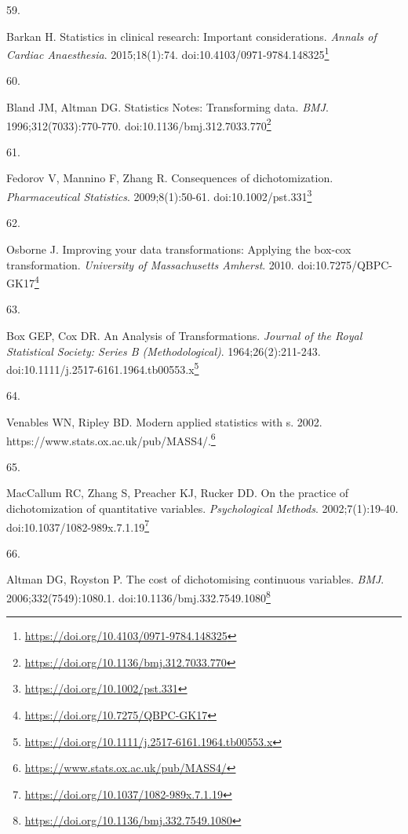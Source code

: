 \documentclass[
  a4paper,
]{book}
\newlength{\cslhangindent}
\newlength{\csllabelwidth}
\newlength{\cslentryspacingunit} %
\newenvironment{CSLReferences}[2] %
 {%
  \setlength{\parindent}{0pt}
  \ifodd #1
  \let\oldpar\par
  \def\par{\hangindent=\cslhangindent\oldpar}
  \fi
  \setlength{\parskip}{#2\cslentryspacingunit}
 }%
 {}
\newcommand{\CSLLeftMargin}[1]{\parbox[t]{\csllabelwidth}{#1}}
\newcommand{\CSLRightInline}[1]{\parbox[t]{\linewidth - \csllabelwidth}{#1}\break}
\renewcommand{\href}[2]{#2\footnote{\url{#1}}}
\begin{document}
\begin{CSLReferences}{0}{0}
\leavevmode{}%
\CSLLeftMargin{59. }%
\CSLRightInline{Barkan H. Statistics in clinical research: Important considerations. \emph{Annals of Cardiac Anaesthesia}. 2015;18(1):74. doi:\href{https://doi.org/10.4103/0971-9784.148325}{10.4103/0971-9784.148325}}

\leavevmode{}%
\CSLLeftMargin{60. }%
\CSLRightInline{Bland JM, Altman DG. Statistics Notes: Transforming data. \emph{BMJ}. 1996;312(7033):770-770. doi:\href{https://doi.org/10.1136/bmj.312.7033.770}{10.1136/bmj.312.7033.770}}

\leavevmode{}%
\CSLLeftMargin{61. }%
\CSLRightInline{Fedorov V, Mannino F, Zhang R. Consequences of dichotomization. \emph{Pharmaceutical Statistics}. 2009;8(1):50-61. doi:\href{https://doi.org/10.1002/pst.331}{10.1002/pst.331}}

\leavevmode{}%
\CSLLeftMargin{62. }%
\CSLRightInline{Osborne J. Improving your data transformations: Applying the box-cox transformation. \emph{University of Massachusetts Amherst}. 2010. doi:\href{https://doi.org/10.7275/QBPC-GK17}{10.7275/QBPC-GK17}}

\leavevmode{}%
\CSLLeftMargin{63. }%
\CSLRightInline{Box GEP, Cox DR. An Analysis of Transformations. \emph{Journal of the Royal Statistical Society: Series B (Methodological)}. 1964;26(2):211-243. doi:\href{https://doi.org/10.1111/j.2517-6161.1964.tb00553.x}{10.1111/j.2517-6161.1964.tb00553.x}}

\leavevmode{}%
\CSLLeftMargin{64. }%
\CSLRightInline{Venables WN, Ripley BD. Modern applied statistics with s. 2002. \href{https://www.stats.ox.ac.uk/pub/MASS4/}{https://www.stats.ox.ac.uk/pub/MASS4/.}}

\leavevmode{}%
\CSLLeftMargin{65. }%
\CSLRightInline{MacCallum RC, Zhang S, Preacher KJ, Rucker DD. On the practice of dichotomization of quantitative variables. \emph{Psychological Methods}. 2002;7(1):19-40. doi:\href{https://doi.org/10.1037/1082-989x.7.1.19}{10.1037/1082-989x.7.1.19}}

\leavevmode{}%
\CSLLeftMargin{66. }%
\CSLRightInline{Altman DG, Royston P. The cost of dichotomising continuous variables. \emph{BMJ}. 2006;332(7549):1080.1. doi:\href{https://doi.org/10.1136/bmj.332.7549.1080}{10.1136/bmj.332.7549.1080}}


\end{CSLReferences}
\end{document}
